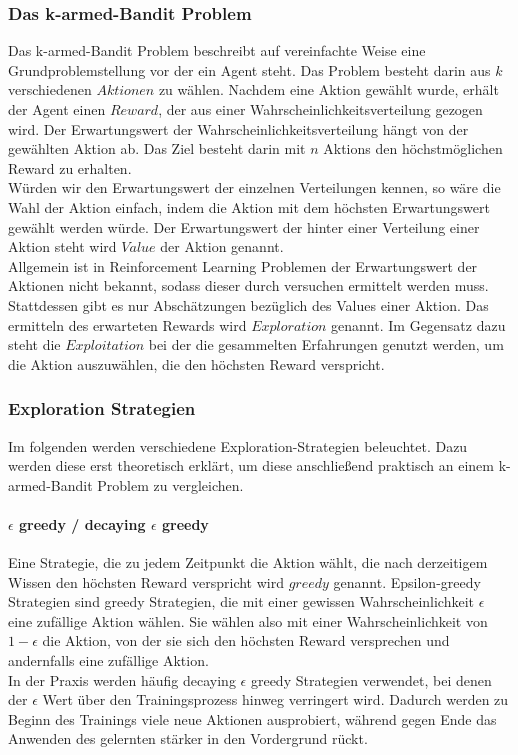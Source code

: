 \documentclass[11pt]{scrartcl}
\begin{document}
\subsubsection{Das k-armed-Bandit Problem}
Das k-armed-Bandit Problem beschreibt auf vereinfachte Weise eine Grundproblemstellung vor
der ein Agent steht. Das Problem besteht darin aus $k$ verschiedenen $Aktionen$ zu wählen.
Nachdem eine Aktion gewählt wurde, erhält der Agent einen $Reward$, der aus einer
Wahrscheinlichkeitsverteilung gezogen wird. Der Erwartungswert der
Wahrscheinlichkeitsverteilung hängt von der gewählten Aktion ab. Das Ziel besteht darin
mit $n$ Aktions den höchstmöglichen Reward zu erhalten.\\
Würden wir den Erwartungswert der einzelnen Verteilungen kennen, so wäre die Wahl der
Aktion einfach, indem die Aktion mit dem höchsten Erwartungswert gewählt werden würde. Der
Erwartungswert der hinter einer Verteilung einer Aktion steht wird $Value$ der Aktion
genannt.\\
Allgemein ist in Reinforcement Learning Problemen der Erwartungswert der Aktionen nicht
bekannt, sodass dieser durch versuchen ermittelt werden muss. Stattdessen gibt es nur
Abschätzungen bezüglich des Values einer Aktion. Das ermitteln des erwarteten Rewards wird
$Exploration$ genannt. Im Gegensatz dazu steht die $Exploitation$ bei der die gesammelten
Erfahrungen genutzt werden, um die Aktion auszuwählen, die den höchsten Reward verspricht.

\subsubsection{Exploration Strategien}
Im folgenden werden verschiedene Exploration-Strategien beleuchtet. Dazu werden diese erst
theoretisch erklärt, um diese anschließend praktisch an einem k-armed-Bandit Problem zu
vergleichen.

\paragraph{$\epsilon$ greedy / decaying $\epsilon$ greedy}
Eine Strategie, die zu jedem Zeitpunkt die Aktion wählt, die nach derzeitigem Wissen den
höchsten Reward verspricht wird $greedy$ genannt. Epsilon-greedy Strategien sind greedy
Strategien, die mit einer gewissen Wahrscheinlichkeit $\epsilon$ eine zufällige Aktion
wählen. Sie wählen also mit einer Wahrscheinlichkeit von $1 - \epsilon$ die Aktion, von
der sie sich den höchsten Reward versprechen und andernfalls eine zufällige Aktion.\\
In der Praxis werden häufig decaying $\epsilon$ greedy Strategien verwendet, bei denen der
$\epsilon$ Wert über den Trainingsprozess hinweg verringert wird. Dadurch werden zu Beginn
des Trainings viele neue Aktionen ausprobiert, während gegen Ende das Anwenden des
gelernten stärker in den Vordergrund rückt.
\end{document}
